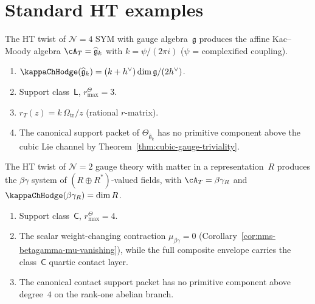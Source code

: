 \section{Standard HT examples}
\label{sec:ht-standard-examples}

\begin{example}[$\mathcal{N}=4$ SYM: affine Kac--Moody]
\label{ex:ht-n4-sym}
The HT twist of $\mathcal{N}=4$ SYM with gauge algebra~$\mathfrak{g}$
produces the affine Kac--Moody algebra
$\cA_T = \widehat{\mathfrak{g}}_k$ with
$k = \psi/(2\pi i)$ ($\psi$ = complexified coupling).
\begin{enumerate}[label=\textup{(\roman*)}]
\item $\kappaChHodge(\widehat{\mathfrak{g}}_k) = (k+h^\vee)\dim\mathfrak{g}/(2h^\vee)$.
\item Support class~$\mathsf{L}$, \(r^\Theta_{\max}=3\).
\item $r_T(z) = k\,\Omega_{\mathrm{tr}}/z$ (rational $r$-matrix).
\item The canonical support packet of
 \(\Theta_{\widehat{\mathfrak{g}}_k}\) has no primitive component above
 the cubic Lie channel by Theorem~\ref{thm:cubic-gauge-triviality}.
\end{enumerate}
\end{example}

\begin{example}[$\mathcal{N}=2$ with hypermultiplets: $\beta\gamma$ systems]
\label{ex:ht-n2-hyper}
The HT twist of $\mathcal{N}=2$ gauge theory with matter in a
representation~$R$ produces the $\beta\gamma$ system of
$(R \oplus R^*)$-valued fields, with
$\cA_T = \beta\gamma_R$ and
$\kappaChHodge(\beta\gamma_R) = \dim R$.
\begin{enumerate}[label=\textup{(\roman*)}]
\item Support class~$\mathsf{C}$, \(r^\Theta_{\max}=4\).
\item The scalar weight-changing contraction
 $\mu_{\beta\gamma} = 0$
 (Corollary~\ref{cor:nms-betagamma-mu-vanishing}), while the full
 composite envelope carries the class~$\mathsf{C}$ quartic contact
 layer.
\item The canonical contact support packet has no primitive component
 above degree~$4$ on the rank-one abelian branch.
\end{enumerate}
\end{example}

